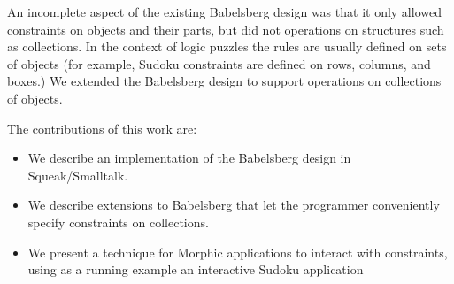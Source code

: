 An incomplete aspect of the existing Babelsberg design was that it
only allowed constraints on objects and their parts, but did not
operations on structures such as collections. In the context of logic
puzzles the rules are usually defined on sets of objects (for example,
Sudoku constraints are defined on rows, columns, and boxes.) We
extended the Babelsberg design to support operations on collections of
objects.

The contributions of this work are:
\begin{itemize}
\item We describe an implementation of the Babelsberg design in
  Squeak/Smalltalk.
\item We describe extensions to Babelsberg that let the programmer
  conveniently specify constraints on collections.
\item We present a technique for Morphic applications to interact with
  constraints, using as a running example an interactive Sudoku application
\end{itemize}




